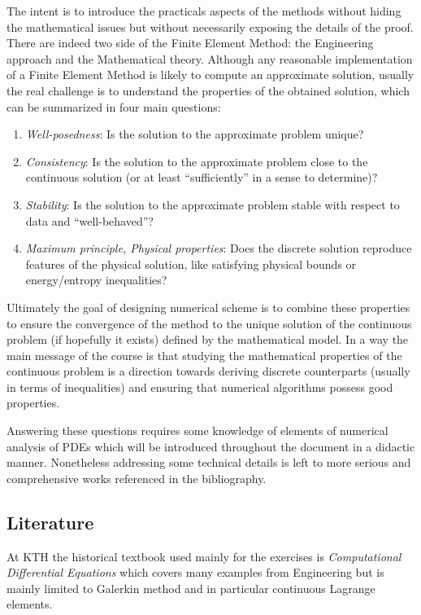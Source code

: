 The intent is to introduce the practicals aspects of the methods without hiding the mathematical issues but without necessarily exposing the details of the proof.
There are indeed two side of the Finite Element Method: the Engineering approach and the Mathematical theory.
Although any reasonable implementation of a Finite Element Method is likely to compute an approximate solution, usually the real challenge is to understand the properties of the obtained solution, which can be summarized in four main questions:
\begin{enumerate}
\item \textit{Well-posedness}: Is the solution to the approximate problem unique?
\item \textit{Consistency}: Is the solution to the approximate problem close to the continuous solution (or at least ``sufficiently'' in a sense to determine)?
\item \textit{Stability}: Is the solution to the approximate problem stable with respect to data and ``well-behaved''?
\item \textit{Maximum principle, Physical properties}: Does the discrete solution reproduce features of the physical solution, like satisfying physical bounds or energy/entropy inequalities?
\end{enumerate}
Ultimately the goal of designing numerical scheme is to combine these properties to ensure the convergence of the method to the unique solution of the continuous problem (if hopefully it exists) defined by the mathematical model.
In a way the main message of the course is that studying the mathematical properties of the continuous problem is a direction towards deriving discrete counterparts (usually in terms of inequalities) and ensuring that numerical algorithms possess good properties.

Answering these questions requires some knowledge of elements of numerical analysis of PDEs which will be introduced throughout the document in a didactic manner.
Nonetheless addressing some technical details is left to more serious and comprehensive works referenced in the bibliography.

\subsection*{Literature}

At KTH the historical textbook used mainly for the exercises is \textit{Computational Differential Equations} \cite{CDE} which covers many examples from Engineering but is mainly limited to Galerkin method and in particular continuous Lagrange elements.

